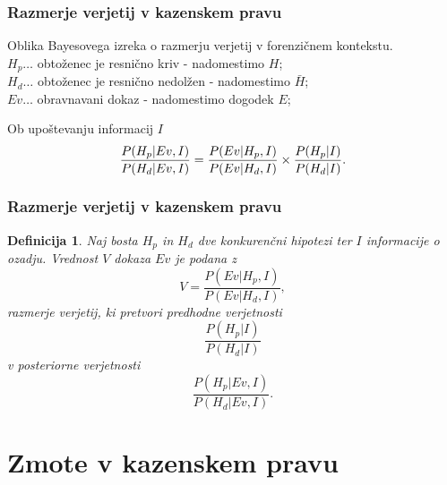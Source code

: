 \documentclass{beamer}
\newtheorem{definicija}{Definicija}
\begin{document}
\begin{frame}
   \frametitle{Razmerje verjetij v kazenskem pravu}
   Oblika Bayesovega izreka o razmerju verjetij v forenzičnem kontekstu.\\ \vspace{2mm}
   $H_p \dots$ obtoženec je resnično kriv - nadomestimo $H$;\\
   $H_d \dots$ obtoženec je resnično nedolžen - nadomestimo $\bar{H}$;\\
   $Ev \dots$ obravnavani dokaz - nadomestimo dogodek $E$;\\ \vspace{2mm}
   \begin{block}{Ob upoštevanju informacij $I$}
       \[
           \frac{P(H_p \lvert Ev, I)}{P(H_d \lvert Ev, I)} = \frac{P(Ev \lvert H_p, I)}{P(Ev \lvert H_d, I)} \times \frac{P(H_p \lvert I)}{P(H_d \lvert I)}. \vspace{2mm}
       \]
   \end{block}
\end{frame}

\begin{frame}
   \frametitle{Razmerje verjetij v kazenskem pravu}
   \begin{definicija}
       Naj bosta  $H_p$ in $H_d$ dve konkurenčni hipotezi ter $I$ informacije o ozadju. Vrednost $V$ dokaza $Ev$ je podana z
       \[
           V = \frac{P(Ev \lvert H_p, I)}{P(Ev \lvert H_d, I)},
       \]
       razmerje verjetij, ki pretvori predhodne verjetnosti
       \[
           \frac{P(H_p \lvert I)}{P(H_d \lvert I)} 
       \]
       v posteriorne verjetnosti
       \[
           \frac{P(H_p \lvert Ev, I)}{P(H_d \lvert Ev, I)}.
       \]
    \end{definicija}     
\end{frame}

\section{Zmote v kazenskem pravu}
\end{document}
